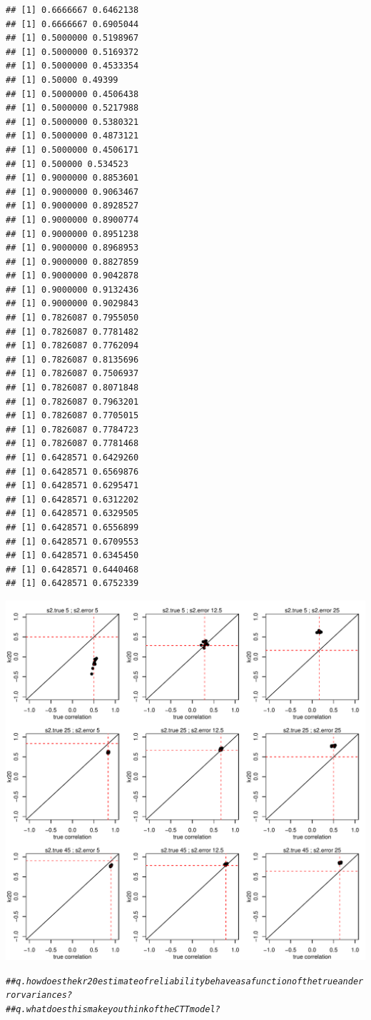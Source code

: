 \documentclass{article}\usepackage[]{graphicx}\usepackage[]{color}
\makeatletter
\def\maxwidth{ %
  \ifdim\Gin@nat@width>\linewidth
    \linewidth
  \else
    \Gin@nat@width
  \fi
}
\newcommand{\hlcom}[1]{\textcolor[rgb]{0.678,0.584,0.686}{\textit{#1}}}%
\newenvironment{kframe}{%
 \def\at@end@of@kframe{}%
 \ifinner\ifhmode%
  \def\at@end@of@kframe{\end{minipage}}%
  \begin{minipage}{\columnwidth}%
 \fi\fi%
 \def\FrameCommand##1{\hskip\@totalleftmargin \hskip-\fboxsep
 \colorbox{shadecolor}{##1}\hskip-\fboxsep
     \hskip-\linewidth \hskip-\@totalleftmargin \hskip\columnwidth}%
 \MakeFramed {\advance\hsize-\width
   \@totalleftmargin\z@ \linewidth\hsize
   \@setminipage}}%
 {\par\unskip\endMakeFramed%
 \at@end@of@kframe}
\newenvironment{knitrout}{}{} %
\makeatother
\begin{document}
\begin{knitrout}
\begin{kframe}
\begin{verbatim}
## [1] 0.6666667 0.6462138
## [1] 0.6666667 0.6905044
## [1] 0.5000000 0.5198967
## [1] 0.5000000 0.5169372
## [1] 0.5000000 0.4533354
## [1] 0.50000 0.49399
## [1] 0.5000000 0.4506438
## [1] 0.5000000 0.5217988
## [1] 0.5000000 0.5380321
## [1] 0.5000000 0.4873121
## [1] 0.5000000 0.4506171
## [1] 0.500000 0.534523
## [1] 0.9000000 0.8853601
## [1] 0.9000000 0.9063467
## [1] 0.9000000 0.8928527
## [1] 0.9000000 0.8900774
## [1] 0.9000000 0.8951238
## [1] 0.9000000 0.8968953
## [1] 0.9000000 0.8827859
## [1] 0.9000000 0.9042878
## [1] 0.9000000 0.9132436
## [1] 0.9000000 0.9029843
## [1] 0.7826087 0.7955050
## [1] 0.7826087 0.7781482
## [1] 0.7826087 0.7762094
## [1] 0.7826087 0.8135696
## [1] 0.7826087 0.7506937
## [1] 0.7826087 0.8071848
## [1] 0.7826087 0.7963201
## [1] 0.7826087 0.7705015
## [1] 0.7826087 0.7784723
## [1] 0.7826087 0.7781468
## [1] 0.6428571 0.6429260
## [1] 0.6428571 0.6569876
## [1] 0.6428571 0.6295471
## [1] 0.6428571 0.6312202
## [1] 0.6428571 0.6329505
## [1] 0.6428571 0.6556899
## [1] 0.6428571 0.6709553
## [1] 0.6428571 0.6345450
## [1] 0.6428571 0.6440468
## [1] 0.6428571 0.6752339
\end{verbatim}
\end{kframe}
\includegraphics[width=\maxwidth]{figure/unnamed-chunk-2-12} 
\begin{kframe}\begin{alltt}
\hlcom{##q. how does the kr20 estimate of reliability behave as a function of the true and error variances?}
\hlcom{##q. what does this make you think of the CTT model? }
\end{alltt}
\end{kframe}
\end{knitrout}
\end{document}
